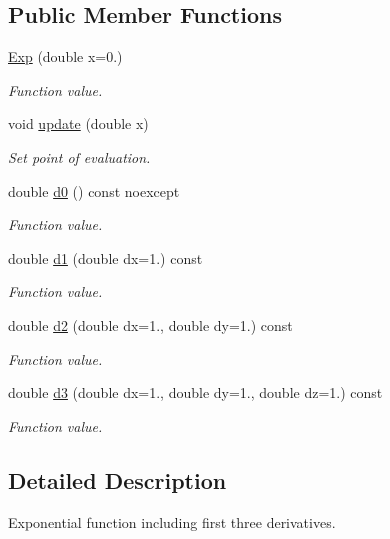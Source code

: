 \subsection*{Public Member Functions}
\begin{DoxyCompactItemize}
\item 
\hyperlink{structfuncy_1_1Exp_abc4f5891f9f896e488a5df25b7ec9a17}{Exp} (double x=0.)
\begin{DoxyCompactList}\small\item\em Function value. \end{DoxyCompactList}\item 
void \hyperlink{structfuncy_1_1Exp_ac8cf23675047df790f6e0b725258093f}{update} (double x)
\begin{DoxyCompactList}\small\item\em Set point of evaluation. \end{DoxyCompactList}\item 
double \hyperlink{structfuncy_1_1Exp_a59e11d1af9acae1c393183ee83011526}{d0} () const noexcept
\begin{DoxyCompactList}\small\item\em Function value. \end{DoxyCompactList}\item 
double \hyperlink{structfuncy_1_1Exp_abf18dadf8bec1b9274d26133b093c482}{d1} (double dx=1.) const 
\begin{DoxyCompactList}\small\item\em Function value. \end{DoxyCompactList}\item 
double \hyperlink{structfuncy_1_1Exp_aefb6bb5a83bc53bbc3a5599dab46d0a7}{d2} (double dx=1., double dy=1.) const 
\begin{DoxyCompactList}\small\item\em Function value. \end{DoxyCompactList}\item 
double \hyperlink{structfuncy_1_1Exp_a8a1cce179c3560158e7eb6a995d8949f}{d3} (double dx=1., double dy=1., double dz=1.) const 
\begin{DoxyCompactList}\small\item\em Function value. \end{DoxyCompactList}\end{DoxyCompactItemize}


\subsection{Detailed Description}
Exponential function including first three derivatives. 

